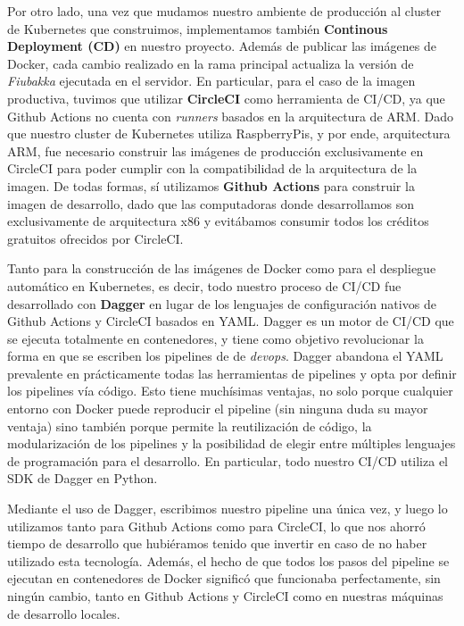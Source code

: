Por otro lado, una vez que mudamos nuestro ambiente de producción al cluster de Kubernetes que construimos, implementamos también \textbf{Continous Deployment (CD)} en nuestro proyecto.
Además de publicar las imágenes de Docker, cada cambio realizado en la rama principal actualiza la versión de \textit{Fiubakka} ejecutada en el servidor. En particular, para el caso de la imagen productiva,
tuvimos que utilizar \textbf{CircleCI} como herramienta de CI/CD, ya que Github Actions no cuenta con \textit{runners} basados en la arquitectura de ARM. Dado que nuestro cluster de Kubernetes utiliza
RaspberryPis, y por ende, arquitectura ARM, fue necesario construir las imágenes de producción exclusivamente en CircleCI para poder cumplir con la compatibilidad de la arquitectura de la imagen. De todas formas, sí utilizamos
\textbf{Github Actions} para construir la imagen de desarrollo, dado que las computadoras donde desarrollamos son exclusivamente de arquitectura x86 y evitábamos consumir todos los créditos gratuitos ofrecidos por CircleCI.

Tanto para la construcción de las imágenes de Docker como para el despliegue automático en Kubernetes, es decir, todo nuestro proceso de CI/CD fue desarrollado con \textbf{Dagger} en lugar de los lenguajes de configuración nativos
de Github Actions y CircleCI basados en YAML. Dagger es un motor de CI/CD que se ejecuta totalmente en contenedores, y tiene como objetivo revolucionar la forma en que se escriben los pipelines de de \textit{devops}.
Dagger abandona el YAML prevalente en prácticamente todas las herramientas de pipelines y opta por definir los pipelines vía código. Esto tiene muchísimas ventajas, no solo porque cualquier entorno con Docker puede reproducir el pipeline
(sin ninguna duda su mayor ventaja) sino también porque permite la reutilización de código, la modularización de los pipelines y la posibilidad de elegir entre múltiples lenguajes de programación para el desarrollo. En particular, todo nuestro
CI/CD utiliza el SDK de Dagger en Python.

Mediante el uso de Dagger, escribimos nuestro pipeline una única vez, y luego lo utilizamos tanto para Github Actions como para CircleCI, lo que nos ahorró tiempo de desarrollo que hubiéramos tenido que invertir en caso de no haber utilizado esta tecnología.
Además, el hecho de que todos los pasos del pipeline se ejecutan en contenedores de Docker significó que funcionaba perfectamente, sin ningún cambio, tanto en Github Actions y CircleCI como en nuestras máquinas de desarrollo locales.


